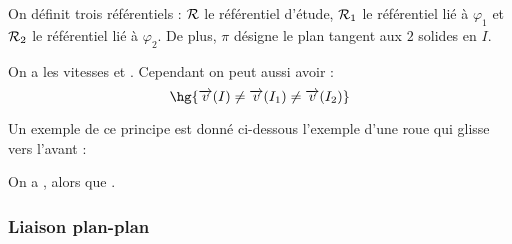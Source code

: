 \documentclass[a4paper,french,bookmarks]{book}
\begin{document}
    On définit trois référentiels : $\mathcal{R}$ le référentiel d'étude, $\mathcal{R}_1$ le référentiel lié à $\varphi_1$ et $\mathcal{R}_2$ le référentiel lié à $\varphi_2$. De plus, $\pi$ désigne le plan tangent aux $2$ solides en $I$.
    
    \begin{warning}{}{}
        On a les vitesses  et . Cependant on peut aussi avoir :
        \[ \hg{\vec v\p{I} \neq \vec v\p{I_1} \neq \vec v\p{I_2}}\]
    \end{warning}
    Un exemple de ce principe est donné ci-dessous l'exemple d'une roue qui glisse vers l'avant :
    \begin{example}{}{}
        \begin{minipage}{0.48\linewidth}
            \centering
        \end{minipage}
        \begin{minipage}{0.48\linewidth}
            On a , alors que .
        \end{minipage}
    \end{example}
    
    \subsubsection{Liaison plan-plan}
    
\end{document}
